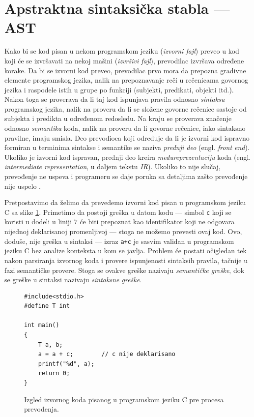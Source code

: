 \section{Apstraktna sintaksička stabla --- AST}
\label{sec:AST}

Kako bi se kod pisan u nekom programskom jeziku (\emph{izvorni fajl}) preveo u kod koji će se izvršavati na nekoj mašini (\emph{izvršivi fajl}), prevodilac izvršava određene korake. Da bi se izvorni kod preveo, prevodilac prvo mora da prepozna gradivne elemente programskog jezika, nalik na prepoznavanje reči u rečenicama govornog jezika i raspodele istih u grupe po funkciji (subjekti, predikati, objekti itd.). Nakon toga se proverava da li taj kod ispunjava pravila odnosno \emph{sintaksu} programskog jezika, nalik na proveru da li se složene govorne rečenice sastoje od subjekta i predikta u određenom redosledu. Na kraju se proverava značenje odnosno \emph{semantika} koda, nalik na proveru da li govorne rečenice, iako sintaksno pravilne, imaju smisla. Deo prevodioca koji određuje da li je izvorni kod ispravno formiran u terminima sintakse i semantike se naziva \emph{prednji deo} (engl. \emph{front end}). Ukoliko je izvorni kod ispravan, prednji deo kreira \emph{međureprezentaciju} koda (engl. \emph{intermediate representation}, u daljem tekstu \emph{IR}). Ukoliko to nije slučaj, prevođenje ne uspeva i programeru se daje poruka sa detaljima zašto prevođenje nije uspelo \cite{EngineeringCompilers}.

Pretpostavimo da želimo da prevedemo izvorni kod pisan u programskom jeziku C sa slike \ref{fig:CompilationProcessInit}. Primetimo da postoji greška u datom kodu --- simbol \texttt{c} koji se koristi u dodeli u liniji $7$ će biti prepoznat kao identifikator koji ne odgovara nijednoj deklarisanoj promenljivoj --- stoga ne možemo prevesti ovaj kod. Ovo, doduše, nije greška u sintaksi --- izraz \texttt{a+c} je sasvim validan u programskom jeziku C bez analize konteksta u kom se javlja. Problem će postati očigledan tek nakon parsiranja izvornog koda i provere ispunjenosti sintaksih pravila, tačnije u fazi semantičke provere. Stoga se ovakve greške nazivaju \emph{semantičke greške}, dok se greške u sintaksi nazivaju \emph{sintaksne greške}.

\begin{figure}[h!]
\begin{lstlisting}
#include<stdio.h>
#define T int

int main()
{
    T a, b;
    a = a + c;        // c nije deklarisano
    printf("%d", a);
    return 0;
}
\end{lstlisting}
\caption{Izgled izvornog koda pisanog u programskom jeziku C pre procesa prevođenja.}
\label{fig:CompilationProcessInit}
\end{figure}

